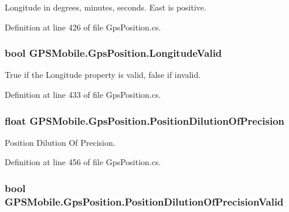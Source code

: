 Longitude in degrees, minutes, seconds. East is positive. 

Definition at line 426 of file GpsPosition.cs.\hypertarget{class_g_p_s_mobile_1_1_gps_position_ab6fb3a2e2b2a92c7c10de450ae1a76db}{
\subsubsection[{LongitudeValid}]{\setlength{\rightskip}{0pt plus 5cm}bool GPSMobile.GpsPosition.LongitudeValid}}
\label{class_g_p_s_mobile_1_1_gps_position_ab6fb3a2e2b2a92c7c10de450ae1a76db}


True if the Longitude property is valid, false if invalid. 

Definition at line 433 of file GpsPosition.cs.\hypertarget{class_g_p_s_mobile_1_1_gps_position_ae0acddfcb9ca7605363317986c086d69}{
\subsubsection[{PositionDilutionOfPrecision}]{\setlength{\rightskip}{0pt plus 5cm}float GPSMobile.GpsPosition.PositionDilutionOfPrecision}}
\label{class_g_p_s_mobile_1_1_gps_position_ae0acddfcb9ca7605363317986c086d69}


Position Dilution Of Precision. 

Definition at line 456 of file GpsPosition.cs.\hypertarget{class_g_p_s_mobile_1_1_gps_position_a2d422682471604af4f9839e06b705c1a}{
\subsubsection[{PositionDilutionOfPrecisionValid}]{\setlength{\rightskip}{0pt plus 5cm}bool GPSMobile.GpsPosition.PositionDilutionOfPrecisionValid}}
\label{class_g_p_s_mobile_1_1_gps_position_a2d422682471604af4f9839e06b705c1a}


